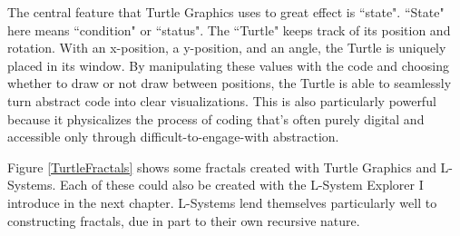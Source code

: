 \documentclass[12pt,twoside]{reedthesis}
\begin{document}
	
	The central feature that Turtle Graphics uses to great effect is ``state". ``State" here means ``condition" or ``status". The ``Turtle" keeps track of its position and rotation. With an x-position, a y-position, and an angle, the Turtle is uniquely placed in its window. By manipulating these values with the code and choosing whether to draw or not draw between positions, the Turtle is able to seamlessly turn abstract code into clear visualizations. This is also particularly powerful because it physicalizes the process of coding that's often purely digital and accessible only through difficult-to-engage-with abstraction.
	
	Figure \ref{TurtleFractals} shows some fractals created with Turtle Graphics and L-Systems. Each of these could also be created with the L-System Explorer I introduce in the next chapter. L-Systems lend themselves particularly well to constructing fractals, due in part to their own recursive nature. 
	
\end{document}
